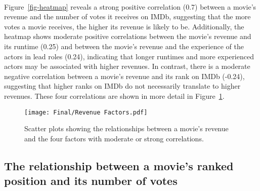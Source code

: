         \paragraph{}
            Figure~\ref{fig-heatmap} reveals a strong positive correlation (0.7) between a
                movie's revenue and the number of votes it receives on IMDb, suggesting that
                the more votes a movie receives, the higher its revenue is likely to be.
            Additionally, the heatmap shows moderate positive correlations between the
                movie's revenue and its runtime (0.25) and between the movie's revenue and the
                experience of the actors in lead roles (0.24), indicating that longer runtimes
                and more experienced actors may be associated with higher revenues.
            In contrast, there is a moderate negative correlation between a movie's revenue
                and its rank on IMDb (-0.24), suggesting that higher ranks on IMDb do not
                necessarily translate to higher revenues.
            These four correlations are shown in more detail in
                Figure~\ref{fig-revenue-factors}.

            \begin{figure}[H]
                \centering
                \texttt{[image: Final/Revenue Factors.pdf]}
                \caption[short]{
                    Scatter plots showing the relationships between a movie's revenue and the four
                    factors with moderate or strong correlations.
                }\label{fig-revenue-factors}
            \end{figure}

    \subsection{The relationship between a movie's ranked position and its number of votes}
        \paragraph{}


